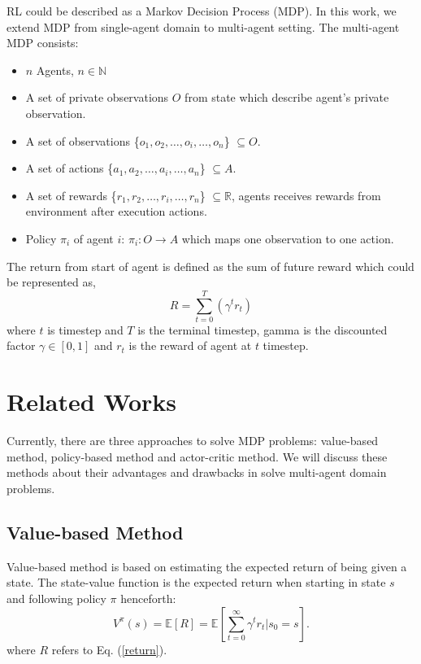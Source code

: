 \documentclass[11pt,twocolumn]{jarticle} %
\begin{document}
RL could be described as a Markov Decision Process (MDP). In this work, we extend MDP from single-agent domain to multi-agent setting. The multi-agent MDP consists:
\begin{itemize}
  \item $n$ Agents, $n \in \mathbb{N}$
  \item A set of private observations $O$ from state which describe agent's private observation. 
  \item A set of observations \{${o_1, o_2,\ldots, o_i, \ldots, o_n}$\} $\subseteq O$.
  \item A set of actions \{${a_1, a_2,\ldots, a_i, \ldots, a_n}$\} $\subseteq A$.
  \item A set of rewards \{${r_1, r_2,\ldots, r_i, \ldots, r_n}$\} $\subseteq \mathbb{R}$, agents receives rewards from environment after execution actions.
  \item Policy $\pi_i$ of agent $i$: $\pi_i: O \rightarrow A$ which maps one observation to one action.
\end{itemize}
The return from start of agent is defined as the sum of future reward which could be represented as, 
\begin{equation}
\label{return}
R = \sum_{t=0}^{T}(\gamma^t r_t)
\end{equation}
where $t$ is timestep and $T$ is the terminal timestep, gamma is the discounted factor $\gamma \in [0, 1]$ and $r_t$ is the reward of agent at $t$ timestep.

\section{Related Works}

Currently, there are three approaches to solve MDP problems: value-based method, policy-based method and actor-critic method. We will discuss these methods about their advantages and drawbacks in solve multi-agent domain problems.

\subsection{Value-based Method}

Value-based method is based on estimating the expected return of being given a state. The state-value function is the expected return when starting in state $s$ and following policy $\pi$ henceforth: 
\begin{equation}
V^\pi(s) = \mathbb{E}[R] = \mathbb{E}[\sum_{t=0}^{\infty}\gamma^t r_t | s_0 = s].
\end{equation}
where $R$ refers to Eq. (\ref{return}). \par
\end{document}

